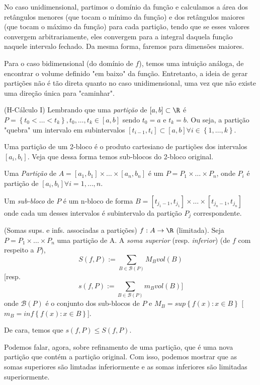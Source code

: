 No caso unidimensional, partimos o domínio da função e calculamos a área dos retângulos menores (que tocam o mínimo da função) e dos retângulos maiores (que tocam o máximo da função) para cada partição, tendo que se esses valores convergem arbitrariamente, eles convergem para a integral daquela função naquele intervalo fechado. Da mesma forma, faremos para dimensões maiores.

Para o caso bidimensional (do domínio de $f$), temos uma intuição análoga, de encontrar o volume definido "em baixo" da função. Entretanto, a ideia de gerar partições não é tão direta quanto no caso unidimensional, uma vez que não existe uma direção única para "caminhar".

\begin{note}
    (H-Cálculo I) Lembrando que uma \emph{partição} de $\left[ a,b \right] \subset \R$ é $P=\left\{ t_0<\ldots<t_k \right\}, t_0,\ldots,t_k \in \left[ a,b \right] $ sendo $t_0=a$ e $t_k=b$. Ou seja, a partição "quebra" um intervalo em subintervalos $\left[ t_{i-1}, t_i \right] \subset \left[ a,b \right] \forall i\in \left\{ 1,\ldots,k \right\} $.
\end{note}

Uma partição de um 2-bloco é o produto cartesiano de partições dos intervalos $\left[ a_i,b_i \right]$. Veja que dessa forma temos sub-blocos do 2-bloco original.

\begin{definition}
    Uma \emph{Partição} de $A=\left[ a_1,b_1 \right]\times \ldots\times \left[ a_n,b_n \right]  $ é um $P=P_1\times \ldots\times P_n$, onde $P_i$ é partição de $\left[ a_i,b_i \right] \forall i=1,\ldots,n$.
    
    Um \emph{sub-bloco} de $P$ é um n-bloco de forma $B = \left[ t_{j_1 -1},t_{j_1} \right] \times \ldots\times \left[ t_{j_n-1}, t_{j_n} \right] $ onde cada um desses intervalos é subintervalo da partição $P_{j}$ correspondente.
\end{definition}

\begin{definition}
    (Somas sups. e infs. associadas a partições) $f: A\to \R$ (limitada). Seja $P=P_1\times \ldots\times P_n$ uma partição de A. A \emph{soma superior} (resp. \emph{inferior}) (de $f$ com respeito a $P$), \[
	S\left( f,P \right) := \sum_{B\in \mathcal{B}\left( P \right) } M_{B}vol\left( B \right) 
    \] [resp. \[
	s\left( f,P \right) := \sum_{B\in \mathcal{B}\left( P \right) } m_{B}vol\left( B \right) 
    ]\] onde $\mathcal{B}\left( P \right) $ é o conjunto dos sub-blocos de $P$ e $M_{B} = sup\left\{ f(x): x\in B \right\} $ [$m_{B}=inf\left\{ f(x):x\in B \right\} $].
\end{definition}

De cara, temos que $s\left( f,P \right) \le S\left( f,P \right)$.

Podemos falar, agora, sobre refinamento de uma partição, que é uma nova partição que contém a partição original. Com isso, podemos mostrar que as somas superiores são limtadas inferiormente e as somas inferiores são limitadas superiormente.

